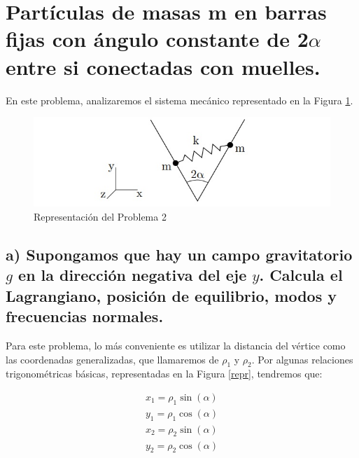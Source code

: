 \documentclass[a4paper,12pt]{article}
\begin{document}
\section{ Partículas de masas m en barras fijas con ángulo constante de 2$\alpha$ entre si conectadas con muelles.}
En este problema, analizaremos el sistema mecánico representado en la Figura \ref{2nd}.
\begin{figure}
  \centering
  \caption{Representación del Problema 2}
  \label{2nd}
  \includegraphics{2.jpg}
\end{figure}

\subsection*{a) Supongamos que hay un campo gravitatorio $g$ en la dirección negativa del eje $y$. Calcula el Lagrangiano, posición de equilibrio, modos y frecuencias normales.}

Para este problema, lo más conveniente es utilizar la distancia del vértice como las coordenadas generalizadas, que llamaremos de $\rho_{1}$ y $\rho_2$. Por algunas relaciones trigonométricas básicas, representadas en la Figura \ref{repr}, tendremos que:

\begin{equation}
  \begin{aligned}
    x_1 = \rho_1 \sin{(\alpha)}\\
    y_1 = \rho_1 \cos{(\alpha)}
  \end{aligned}
\end{equation}
\begin{equation}
  \begin{aligned}
    x_2 = \rho_2 \sin{(\alpha)}\\
    y_2 = \rho_2 \cos{(\alpha)}
  \end{aligned}
\end{equation}
\end{document}
